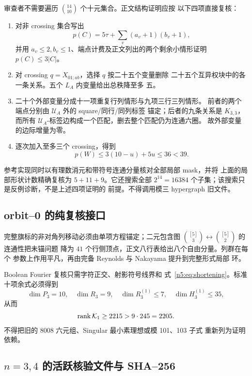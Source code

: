 审查者不需要遍历 \(\binom{14}{10}\) 个十元集合。正文结构证明应按
以下四项直接复核：
\begin{enumerate}
\item 对非 crossing 集合写出
\[
p(C)=5\tau+\sum_v(a_v+1)(b_v+1),
\]
并用 \(a_v\le2,b_v\le1\)、端点计费及正文列出的两个剩余小情形证明
\(p(C)\le3|C|\)。
\item 对 crossing \(q=X_{01;ab}\)，选择 \(q\) 按二十五个变量删除
二十五个互异权块中的各一条关系。五个 \(L_A\) 内变量给出总秩降至多
五。
\item 二十个外部变量分成十一项重复行列情形与九项三行三列情形。
前者的两个端点分别由 \(\mathcal U_A\) 外的 square/同行/同列标签
锚定；后者的九条关系是 \(K_{3,3}\)，而所有
\(\mathcal U_A\)-标签边构成一个匹配，删去整个匹配仍为连通六圈。
故外部变量的边际增量为零。
\item 逐次加入至多三个 crossing，得到
\[
p(W)\le3(10-u)+5u\le36<39.
\]
\end{enumerate}

参考实现同时以有理数消元和带符号连通分量核对全部局部 mask，并将
上面的局部形状计数精确复核为 \(5+11+9\)。它还搜索全部
\(2^{14}=16384\) 个子集；该搜索只是反例诊断，不是上述四项证明的
前提。不得调用模三 hypergraph 旧文件。

\subsection{orbit--0 的纯复核接口}

完整旗标的非对角列移动必须由单项方程锚定；二元包含图
\(\binom{[5]}3\leftrightarrow\binom{[5]}2\) 的连通性把未锚问题
降为 \(41\) 个行侧顶点，正文八行表给出八个自由分量。列群在每个
参数上作用平凡，再由完备 Reynolds 与 Nakayama 提升到完整形式局部
环。

Boolean Fourier 复核只需字符正交、射影符号线界和
式~\eqref{n5:eq:shortening}。标准十项余式必须得到
\[
\dim P_3=10,\quad\dim R_3=9,\quad
\dim R_3^{(1)}\le7,\quad
\dim H_3^{(1)}\le35,
\]
从而
\[
\operatorname{rank}\mathcal K_1\ge2215>9\cdot245=2205.
\]
不得把旧的 8008 六元组、Singular 最小素理想或模 101、103 子式
重新列为证明依赖。

\subsection{$n=3,4$ 的活跃核验文件与 SHA--256}

